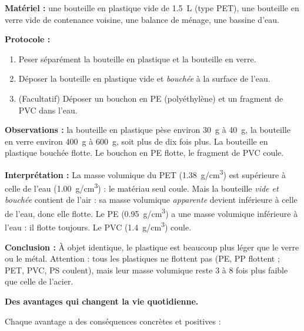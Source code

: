 \documentclass[11pt]{article}
\newcommand{\cle}[1]{{\popxbold\color{popdark}#1}}
\begin{document}
\begin{experience}
\textbf{Matériel :} une bouteille en plastique vide de \SI{1,5}{L} (type PET), une bouteille en verre vide de contenance voisine, une balance de ménage, une bassine d'eau.

\textbf{Protocole :}
\begin{enumerate}
\item Peser séparément la bouteille en plastique et la bouteille en verre.
\item Déposer la bouteille en plastique vide et \emph{bouchée} à la surface de l'eau.
\item (Facultatif) Déposer un bouchon en PE (polyéthylène) et un fragment de PVC dans l'eau.
\end{enumerate}

\textbf{Observations :} la bouteille en plastique pèse environ \SI{30}{g} à \SI{40}{g}, la bouteille en verre environ \SI{400}{g} à \SI{600}{g}, soit plus de dix fois plus. La bouteille en plastique bouchée flotte. Le bouchon en PE flotte, le fragment de PVC coule.

\textbf{Interprétation :} La masse volumique du PET (\approx \SI{1,38}{g/cm^3}) est supérieure à celle de l'eau (\SI{1,00}{g/cm^3}) : le matériau seul coule. Mais la bouteille \emph{vide et bouchée} contient de l'air : sa masse volumique \emph{apparente} devient inférieure à celle de l'eau, donc elle flotte. Le PE (\approx \SI{0,95}{g/cm^3}) a une masse volumique inférieure à l'eau : il flotte toujours. Le PVC (\approx \SI{1,4}{g/cm^3}) coule.

\textbf{Conclusion :} À objet identique, le plastique est beaucoup plus léger que le verre ou le métal. Attention : \cle{tous les plastiques ne flottent pas} (PE, PP flottent ; PET, PVC, PS coulent), mais leur masse volumique reste 3 à 8 fois plus faible que celle de l'acier.
\end{experience}

\textbf{Des avantages qui changent la vie quotidienne.}

Chaque avantage a des conséquences concrètes et positives :
\end{document}
